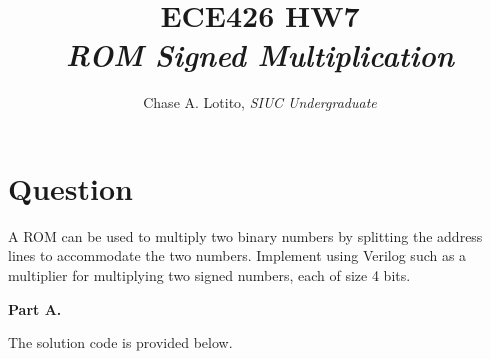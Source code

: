 \documentclass{article}
\title{\vspace{-3cm} ECE426 HW7 \\ \textit{\normalsize ROM Signed Multiplication}}
\author{Chase A. Lotito, \textit{SIUC Undergraduate}}
\date{}
\begin{document}
\pagestyle{fancy}

\fancyhead{}

\maketitle %

\section*{Question}

A ROM can be used to multiply two binary numbers by splitting the address lines to accommodate the two numbers. Implement using Verilog such as a multiplier for multiplying two signed numbers, each of size 4 bits.

\bigskip

\textbf{Part A.}

The solution code is provided below.
\end{document}
